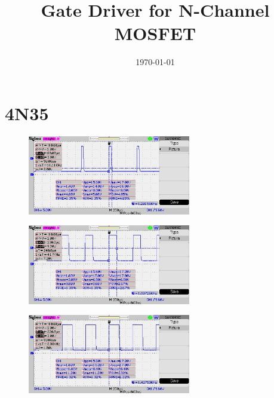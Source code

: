 \documentclass[a4paper, 11pt, oneside]{uet_thesis}  %
\begin{document}
	\frontmatter	  %
	
	\title  {Gate Driver for N-Channel
		MOSFET}
	
	\addresses  {\deptname \\ \univname}  %
	\date       {\today}
	\subject    {}
	\keywords   {}
	
	\maketitle
	\centering
	\section{4N35}
	
	\begin{figure}[htbp]
	\centering
	\includegraphics[width = 2.8in]{./Figures/4n35/1}
\end{figure}	

	\begin{figure}[htbp]
	\centering
	\includegraphics[width = 2.8in]{./Figures/4n35/3}
\end{figure}	

	\begin{figure}[htbp]
	\centering
	\includegraphics[width = 2.8in]{./Figures/4n35/5}
\end{figure}	
\end{document}
